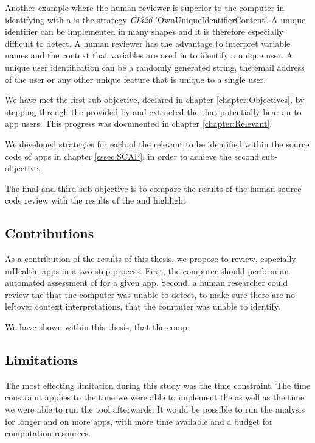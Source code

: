 Another example where the human reviewer is superior to the computer in identifying \ipr with a \sca is the strategy \textit{CI326} 'OwnUniqueIdentifierContent'.
A unique identifier can be implemented in many shapes and it is therefore especially difficult to detect.
A human reviewer has the advantage to interpret variable names and the context that variables are used in to identify a unique user.
A unique user identification can be a randomly generated string, the email address of the user or any other unique feature that is unique to a single user.

We have met the first sub-objective, declared in chapter \ref{chapter:Objectives}, by stepping through the \ipp provided by \textcite{Dehling2016} and extracted the \ipp that potentially bear an \ipr to \mH app users.
This progress was documented in chapter \ref{chapter:Relevant}.

We developed strategies for each of the relevant \ipp to be identified within the source code of \mH apps in chapter \ref{sssec:SCAP}, in order to achieve the second sub-objective.

The final and third sub-objective is to compare the results of the human source code review with the results of the \aiprat and highlight 



\subsection{Contributions}

As a contribution of the results of this thesis, we propose to review, especially mHealth, apps in a two step process.
First, the computer should perform an automated \sca assessment of \ipr for a given app.
Second, a human researcher could review the \ipr that the computer was unable to detect, to make sure there are no leftover context interpretations, that the computer was unable to identify.

We have shown within this thesis, that the comp

\subsection{Limitations}\label{chapter:Limitations}

The most effecting limitation during this study was the time constraint.
The time constraint applies to the time we were able to implement the \aiprat as well as the time we were able to run the tool afterwards.
It would be possible to run the analysis for longer and on more apps, with more time available and a budget for computation resources.


